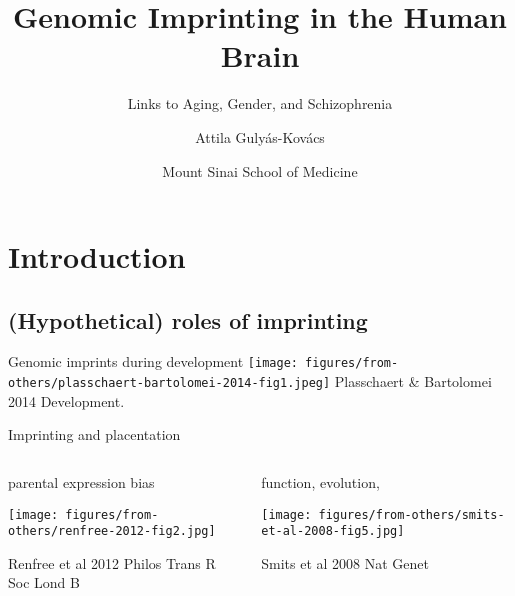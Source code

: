 \documentclass{beamer}
\title{Genomic Imprinting in the Human Brain}
\subtitle{Links to Aging, Gender, and Schizophrenia}
\author{Attila Guly\'{a}s-Kov\'{a}cs}
\date{Mount Sinai School of Medicine}
\begin{document}
\maketitle

\section{Introduction}
\subsection{(Hypothetical) roles of imprinting}

\begin{frame}{Genomic imprints during development}
\texttt{[image: figures/from-others/plasschaert-bartolomei-2014-fig1.jpeg]}
\vfill
{\tiny Plasschaert \& Bartolomei 2014 Development.}
\end{frame}

\begin{frame}{Imprinting and placentation}{}
\begin{columns}[t]
\begin{column}{0.4\textwidth}

parental expression bias

\texttt{[image: figures/from-others/renfree-2012-fig2.jpg]}

{\tiny Renfree et al 2012 Philos Trans R Soc Lond B}

\end{column}

\begin{column}{0.6\textwidth}

function, evolution,

\texttt{[image: figures/from-others/smits-et-al-2008-fig5.jpg]}

{\tiny Smits et al 2008 Nat Genet}
\end{column}
\end{columns}
\begin{center}
\end{center}
\end{frame}

%
\end{document}
